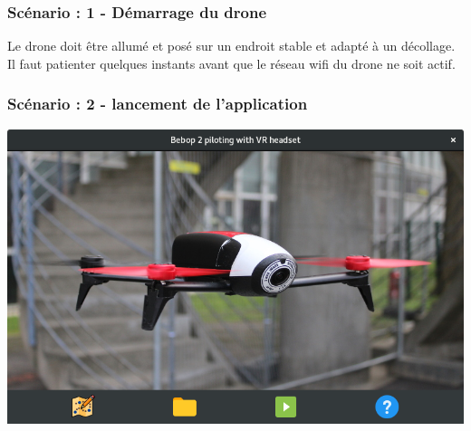 \documentclass{beamer}
\begin{document}


	\begin{frame}
		\begin{center}
		\frametitle{Scénario : 1 - Démarrage du drone}
        Le drone doit être allumé et posé sur un endroit stable et adapté à un décollage.\\
        Il faut patienter quelques instants avant que le réseau wifi du drone ne soit actif.\\
		\end{center}
	\end{frame}



	\begin{frame}
		\begin{center}
		\frametitle{Scénario : 2 - lancement de l'application}

        \includegraphics[scale=0.4]{main-GUI.png}
		\end{center}
	\end{frame}
	
\end{document}
